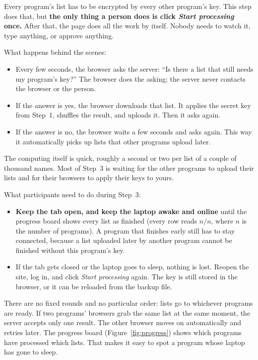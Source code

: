 \documentclass[11pt]{article}
\begin{document}
Every program's list has to be encrypted by every other program's key. This step does that, but
\textbf{the only thing a person does is click \emph{Start processing} once.} After that, the page
does all the work by itself. Nobody needs to watch it, type anything, or approve anything.

What happens behind the scenes:
\begin{itemize}
  \item Every few seconds, the browser asks the server: ``Is there a list that still needs my
        program's key?'' The browser does the asking; the server never contacts the browser or
        the person.
  \item If the answer is yes, the browser downloads that list. It applies the secret key from
        Step~1, shuffles the result, and uploads it. Then it asks again.
  \item If the answer is no, the browser waits a few seconds and asks again. This way it
        automatically picks up lists that other programs upload later.
\end{itemize}

The computing itself is quick, roughly a second or two per list of a couple of thousand names. Most
of Step~3 is waiting for the other programs to upload their lists and for their browsers to apply
their keys to yours.

What participants need to do during Step~3:
\begin{itemize}
  \item \textbf{Keep the tab open, and keep the laptop awake and online} until the progress board
        shows every list as finished (every row reads $n/n$, where $n$ is the number of programs).
        A program that finishes early still has to stay connected, because a list uploaded later by
        another program cannot be finished without this program's key.
  \item If the tab gets closed or the laptop goes to sleep, nothing is lost. Reopen the site, log in,
        and click \emph{Start processing} again. The key is still stored in the browser, or it can
        be reloaded from the backup file.
\end{itemize}

There are no fixed rounds and no particular order: lists go to whichever programs are ready. If two
programs' browsers grab the same list at the same moment, the server accepts only one result. The
other browser moves on automatically and retries later. The progress board
(Figure~\ref{fig:progress}) shows which programs have processed which lists. That makes it easy to
spot a program whose laptop has gone to sleep.
\end{document}
